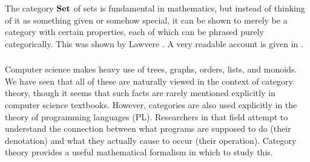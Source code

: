 \documentclass[../main/CT4S-EN-RU]{subfiles}
\begin{document}
\begin{exerciseRUS}\label{exc:juris 2}
\end{exerciseRUS}


\subsubsection{}

\begin{blockENG}
The category ${\mathbf{Set}}$ of sets is fundamental in mathematics, but instead of thinking of it as something given or somehow special, it can be shown to merely be a category with certain properties, each of which can be phrased purely categorically. This was shown by Lawvere \cite{Law}. A very readable account is given in \cite{Le2}.
\end{blockENG}

\begin{blockRUS}
\end{blockRUS}


\subsubsection{}

\begin{blockENG}
Computer science makes heavy use of trees, graphs, orders, lists, and monoids. We have seen that all of these are naturally viewed in the context of category theory, though it seems that such facts are rarely mentioned explicitly in computer science textbooks. However, categories are also used explicitly in the theory of programming languages (PL). Researchers in that field attempt to understand the connection between what programs are supposed to do (their denotation) and what they actually cause to occur (their operation). Category theory provides a useful mathematical formalism in which to study this.
\end{blockENG}

\begin{blockRUS}
\end{blockRUS}
\end{document}
